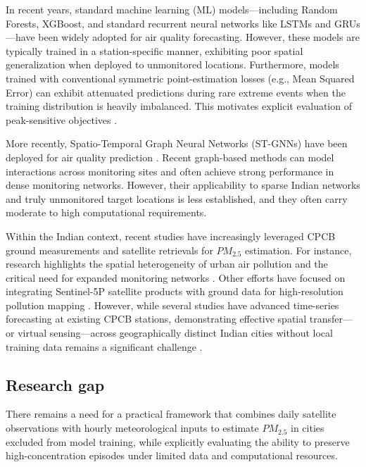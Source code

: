 In recent years, standard machine learning (ML) models—including Random Forests, XGBoost, and standard recurrent neural networks like LSTMs and GRUs—have been widely adopted for air quality forecasting. However, these models are typically trained in a station-specific manner, exhibiting poor spatial generalization when deployed to unmonitored locations. Furthermore, models trained with conventional symmetric point-estimation losses (e.g., Mean Squared Error) can exhibit attenuated predictions during rare extreme events when the training distribution is heavily imbalanced. This motivates explicit evaluation of peak-sensitive objectives \cite{lee2023dir}.

More recently, Spatio-Temporal Graph Neural Networks (ST-GNNs) have been deployed for air quality prediction \cite{chen2023pm25gnn}. Recent graph-based methods can model interactions across monitoring sites and often achieve strong performance in dense monitoring networks. However, their applicability to sparse Indian networks and truly unmonitored target locations is less established, and they often carry moderate to high computational requirements.

Within the Indian context, recent studies have increasingly leveraged CPCB ground measurements and satellite retrievals for $PM_{2.5}$ estimation. For instance, research highlights the spatial heterogeneity of urban air pollution and the critical need for expanded monitoring networks \cite{kumar2023cpcb}. Other efforts have focused on integrating Sentinel-5P satellite products with ground data for high-resolution pollution mapping \cite{singh2023sentinel}. However, while several studies have advanced time-series forecasting at existing CPCB stations, demonstrating effective spatial transfer—or virtual sensing—across geographically distinct Indian cities without local training data remains a significant challenge \cite{das2024virtual}.

\subsection{Research gap}
There remains a need for a practical framework that combines daily satellite observations with hourly meteorological inputs to estimate $PM_{2.5}$ in cities excluded from model training, while explicitly evaluating the ability to preserve high-concentration episodes under limited data and computational resources.

